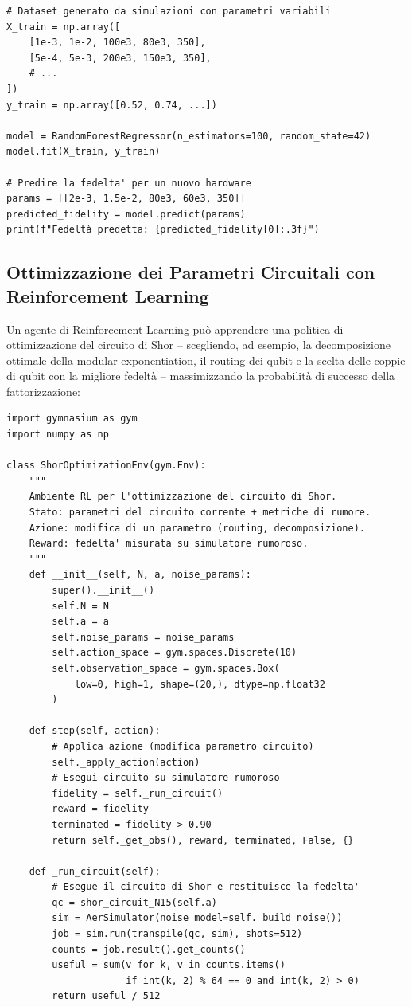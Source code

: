 \begin{onehalfspace}
\begin{lstlisting}[caption={Regressore per la fedeltà del circuito di Shor}]
# Dataset generato da simulazioni con parametri variabili
X_train = np.array([
    [1e-3, 1e-2, 100e3, 80e3, 350],
    [5e-4, 5e-3, 200e3, 150e3, 350],
    # ...
])
y_train = np.array([0.52, 0.74, ...])

model = RandomForestRegressor(n_estimators=100, random_state=42)
model.fit(X_train, y_train)

# Predire la fedelta' per un nuovo hardware
params = [[2e-3, 1.5e-2, 80e3, 60e3, 350]]
predicted_fidelity = model.predict(params)
print(f"Fedeltà predetta: {predicted_fidelity[0]:.3f}")
\end{lstlisting}

\subsection{Ottimizzazione dei Parametri Circuitali con Reinforcement Learning}

Un agente di Reinforcement Learning può apprendere una politica di ottimizzazione del circuito di Shor -- scegliendo, ad esempio, la decomposizione ottimale della modular exponentiation, il routing dei qubit e la scelta delle coppie di qubit con la migliore fedeltà -- massimizzando la probabilità di successo della fattorizzazione:

\begin{lstlisting}[caption={Struttura dell'ambiente RL per ottimizzazione circuitale}]
import gymnasium as gym
import numpy as np

class ShorOptimizationEnv(gym.Env):
    """
    Ambiente RL per l'ottimizzazione del circuito di Shor.
    Stato: parametri del circuito corrente + metriche di rumore.
    Azione: modifica di un parametro (routing, decomposizione).
    Reward: fedelta' misurata su simulatore rumoroso.
    """
    def __init__(self, N, a, noise_params):
        super().__init__()
        self.N = N
        self.a = a
        self.noise_params = noise_params
        self.action_space = gym.spaces.Discrete(10)
        self.observation_space = gym.spaces.Box(
            low=0, high=1, shape=(20,), dtype=np.float32
        )

    def step(self, action):
        # Applica azione (modifica parametro circuito)
        self._apply_action(action)
        # Esegui circuito su simulatore rumoroso
        fidelity = self._run_circuit()
        reward = fidelity
        terminated = fidelity > 0.90
        return self._get_obs(), reward, terminated, False, {}

    def _run_circuit(self):
        # Esegue il circuito di Shor e restituisce la fedelta'
        qc = shor_circuit_N15(self.a)
        sim = AerSimulator(noise_model=self._build_noise())
        job = sim.run(transpile(qc, sim), shots=512)
        counts = job.result().get_counts()
        useful = sum(v for k, v in counts.items()
                     if int(k, 2) % 64 == 0 and int(k, 2) > 0)
        return useful / 512
\end{lstlisting}


\end{onehalfspace}
